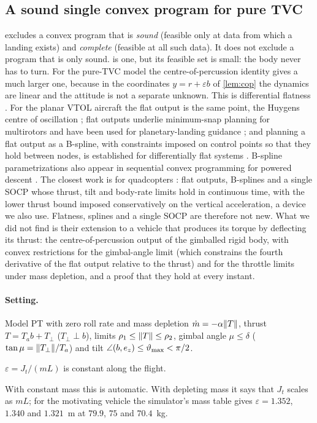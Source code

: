 \subsection{A sound single convex program for pure TVC}\label{sec:F}
 excludes a convex program that is \emph{sound} (feasible only at data from which a landing exists) and
\emph{complete} (feasible at all such data). It does not exclude a program that is only sound.  is one, but its
feasible set is small: the body never has to turn. For the pure-TVC model the centre-of-percussion identity gives a much larger one,
because in the coordinates $y=r+\varepsilon b$ of \cref{lem:cop} the dynamics are linear and the attitude is not a separate unknown.
This is differential flatness \cite{fliess1995ijc}. For the planar VTOL aircraft the flat output is the same point, the Huygens
centre of oscillation \cite{martin1996automatica}; flat outputs underlie minimum-snap planning for multirotors
\cite{mellinger2011icra} and have been used for planetary-landing guidance \cite{desiderio2013tcst}; and planning a flat output as a
B-spline, with constraints imposed on control points so that they hold between nodes, is established for differentially flat systems
\cite{vanloock2015acc}. B-spline parametrizations also appear in sequential convex programming for powered descent
\cite{wang2026asr}. The closest work is for quadcopters \cite{freire2023tcst}: flat outputs, B-splines and a single SOCP whose thrust,
tilt and body-rate limits hold in continuous time, with the lower thrust bound imposed conservatively on the vertical acceleration,
a device we also use. Flatness, splines and a single SOCP are therefore not new. What we did not find is their extension to a vehicle
that produces its torque by deflecting its thrust: the centre-of-percussion output of the gimballed rigid body, with convex
restrictions for the gimbal-angle limit (which constrains the fourth derivative of the flat output relative to the thrust) and for
the throttle limits under mass depletion, and a proof that they hold at every instant.

\paragraph{Setting.} Model PT with zero roll rate and mass depletion $\dot m=-\alpha\lVert T\rVert$, thrust $T=T_ab+T_\perp$ ($T_\perp\perp b$),
limits $\rho_1\le\lVert T\rVert\le\rho_2$, gimbal angle $\mu\le\delta$ ($\tan\mu=\lVert T_\perp\rVert/T_a$) and tilt $\angle(b,e_z)\le\vartheta_{\max}<\pi/2$.
\begin{assumption}\label{ass:cop}
$\varepsilon=J_t/(mL)$ is constant along the flight.
\end{assumption}
\noindent With constant mass this is automatic. With depleting mass it says that $J_t$ scales as $mL$; for the motivating vehicle the
simulator's mass table gives $\varepsilon=1.352$, $1.340$ and $1.321$~m at $79.9$, $75$ and $70.4$~kg.

